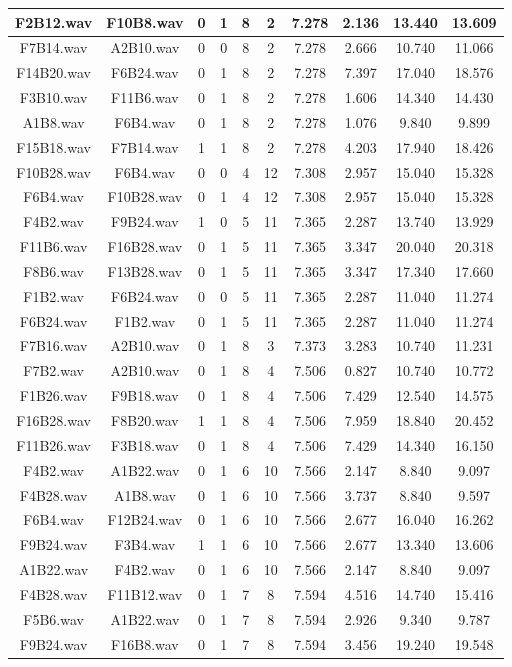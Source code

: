 \documentclass[11pt,a4paper]{book}
\begin{document}
\begin{longtable}[c]{|c|c|c|c|c|c|c|c|c|c|}
F2B12.wav&F10B8.wav&0&1&8&2&7.278&2.136&13.440&13.609\\ \hline
F7B14.wav&A2B10.wav&0&0&8&2&7.278&2.666&10.740&11.066\\ \hline
F14B20.wav&F6B24.wav&0&1&8&2&7.278&7.397&17.040&18.576\\ \hline
F3B10.wav&F11B6.wav&0&1&8&2&7.278&1.606&14.340&14.430\\ \hline
A1B8.wav&F6B4.wav&0&1&8&2&7.278&1.076&9.840&9.899\\ \hline
F15B18.wav&F7B14.wav&1&1&8&2&7.278&4.203&17.940&18.426\\ \hline
F10B28.wav&F6B4.wav&0&0&4&12&7.308&2.957&15.040&15.328\\ \hline
F6B4.wav&F10B28.wav&0&1&4&12&7.308&2.957&15.040&15.328\\ \hline
F4B2.wav&F9B24.wav&1&0&5&11&7.365&2.287&13.740&13.929\\ \hline
F11B6.wav&F16B28.wav&0&1&5&11&7.365&3.347&20.040&20.318\\ \hline
F8B6.wav&F13B28.wav&0&1&5&11&7.365&3.347&17.340&17.660\\ \hline
F1B2.wav&F6B24.wav&0&0&5&11&7.365&2.287&11.040&11.274\\ \hline
F6B24.wav&F1B2.wav&0&1&5&11&7.365&2.287&11.040&11.274\\ \hline
F7B16.wav&A2B10.wav&0&1&8&3&7.373&3.283&10.740&11.231\\ \hline
F7B2.wav&A2B10.wav&0&1&8&4&7.506&0.827&10.740&10.772\\ \hline
F1B26.wav&F9B18.wav&0&1&8&4&7.506&7.429&12.540&14.575\\ \hline
F16B28.wav&F8B20.wav&1&1&8&4&7.506&7.959&18.840&20.452\\ \hline
F11B26.wav&F3B18.wav&0&1&8&4&7.506&7.429&14.340&16.150\\ \hline
F4B2.wav&A1B22.wav&0&1&6&10&7.566&2.147&8.840&9.097\\ \hline
F4B28.wav&A1B8.wav&0&1&6&10&7.566&3.737&8.840&9.597\\ \hline
F6B4.wav&F12B24.wav&0&1&6&10&7.566&2.677&16.040&16.262\\ \hline
F9B24.wav&F3B4.wav&1&1&6&10&7.566&2.677&13.340&13.606\\ \hline
A1B22.wav&F4B2.wav&0&1&6&10&7.566&2.147&8.840&9.097\\ \hline
F4B28.wav&F11B12.wav&0&1&7&8&7.594&4.516&14.740&15.416\\ \hline
F5B6.wav&A1B22.wav&0&1&7&8&7.594&2.926&9.340&9.787\\ \hline
F9B24.wav&F16B8.wav&0&1&7&8&7.594&3.456&19.240&19.548\\ \hline

\end{longtable}
\end{document}
